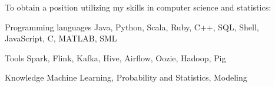 

\begin{cvparagraph}

To obtain a position utilizing my skills in computer science and statistics:

\begin{cvskills}

  \cvskill
    {Programming languages} %
    {Java, Python, Scala, Ruby, C++, SQL, Shell, JavaScript, C, MATLAB, SML} %

  \cvskill
    {Tools} %
    {Spark, Flink, Kafka, Hive, Airflow, Oozie, Hadoop, Pig} %

  \cvskill
    {Knowledge} %
    {Machine Learning, Probability and Statistics, Modeling} %

\end{cvskills}


\end{cvparagraph}
